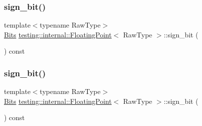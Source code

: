 \mbox{\label{classtesting_1_1internal_1_1_floating_point_afb8a816bb598225d775caaf43a893ef0}} 
\subsubsection{\texorpdfstring{sign\_bit()}{sign\_bit()}\hspace{0.1cm}{\footnotesize\ttfamily [2/3]}}
{\footnotesize\ttfamily template$<$typename Raw\+Type$>$ \\
\mbox{\hyperlink{classtesting_1_1internal_1_1_floating_point_abf228bf6cd48f12c8b44c85b4971a731}{Bits}} \mbox{\hyperlink{classtesting_1_1internal_1_1_floating_point}{testing\+::internal\+::\+Floating\+Point}}$<$ Raw\+Type $>$\+::sign\+\_\+bit (\begin{DoxyParamCaption}{ }\end{DoxyParamCaption}) const\hspace{0.3cm}{\ttfamily [inline]}}

\mbox{\label{classtesting_1_1internal_1_1_floating_point_afb8a816bb598225d775caaf43a893ef0}} 
\subsubsection{\texorpdfstring{sign\_bit()}{sign\_bit()}\hspace{0.1cm}{\footnotesize\ttfamily [3/3]}}
{\footnotesize\ttfamily template$<$typename Raw\+Type$>$ \\
\mbox{\hyperlink{classtesting_1_1internal_1_1_floating_point_abf228bf6cd48f12c8b44c85b4971a731}{Bits}} \mbox{\hyperlink{classtesting_1_1internal_1_1_floating_point}{testing\+::internal\+::\+Floating\+Point}}$<$ Raw\+Type $>$\+::sign\+\_\+bit (\begin{DoxyParamCaption}{ }\end{DoxyParamCaption}) const\hspace{0.3cm}{\ttfamily [inline]}}

